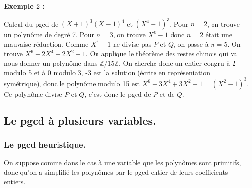 \documentclass[a4paper,11pt]{article}
\begin{document}
{\bf{Exemple} 2 :}

Calcul du pgcd de $( X + 1 )^3 ( X - 1 )^4$ et $( X^4 - 1 )^3$. 
Pour $n = 2$, on trouve un polynôme de degré 7.
Pour $n = 3$, on trouve $X^6 - 1$ donc $n = 2$ était une mauvaise réduction.
Comme $X^6 - 1$ ne divise pas $P$ et $Q$, on passe à $n = 5$. On trouve $X^6 +
2 X^4 - 2 X^2 - 1$. On applique le théorème des restes chinois qui va nous
donner un polynôme dans $\mathbb{Z} / 15 \mathbb{Z}$. On cherche donc un
entier congru à 2 modulo 5 et à 0 modulo 3, -3 est la solution (écrite en
représentation symétrique), donc le polynôme modulo 15 est $X^6 - 3 X^4 + 3
X^2 - 1 = ( X^2 - 1 )^3$. Ce polynôme divise $P$ et $Q$, c'est donc le pgcd de
$P$ et de $Q$.

\subsection{Le pgcd à plusieurs variables.}

\subsubsection{Le pgcd heuristique.}

On suppose comme dans le cas à une variable que les polynômes sont primitifs,
donc qu'on a simplifié les polynômes par le pgcd entier de leurs coefficients
entiers.
\end{document}
